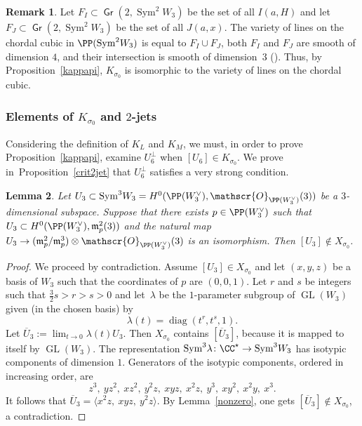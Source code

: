 \documentclass[JEP,XML,SOM,Unicode, NoEqCountersInSection,NoFloatCountersInSection]{cedram}
\let\mathcal\mathscr
\newtheorem{lemm}{Lemma}[section]
\theoremstyle{definition}
\newtheorem{rema}[lemm]{Remark}
\newcommand\cO{\mathcal{O}}\let\OO\cO
\DeclareMathOperator{\Gr}{\mathsf{Gr}}
\newcommand{\gm}{\mathfrak{m}}
\let\la\langle
\let\ra\rangle
\let\ov\overline
\DeclareMathOperator{\GL}{GL}
\DeclareMathOperator{\Sym}{Sym}
\DeclareMathOperator{\diag}{diag}
\begin{document}
\begin{rema}\label{rema710}
Let $F_I\subset \Gr(2,\Sym^2\! W_3)$ be the set of all $I(a,H)$ and let $F_J\subset \Gr(2,\Sym^2\! W_3)$ be
the set of all $J(a,x)$. The variety of lines on the chordal cubic in $\PP(\Sym^2\! W_{3})$ is equal to $F_I\cup F_J$, both $F_I$ and $F_J$ are smooth of dimension $4$, and their intersection is smooth of dimension~$3$
(\cite[Prop.\,3.2.4]{vdd}). Thus, by Proposition~\ref{kappapi}, $K_{\sigma_0}$ is isomorphic to
the variety of lines on the chordal cubic.
\end{rema}

\subsubsection{Elements of $K_{\sigma_0}$ and $2$-jets}
Considering the definition of $K_L$ and $K_M$, we must, in order to prove Proposition~\ref{kappapi}, examine $U_6^{\bot}$ when $[U_6]\in K_{\sigma_0}$. We prove in~Proposition~\ref{crit2jet} that $U_6^{\bot}$ satisfies a very strong condition.

\begin{lemm}\label{stab2jet}
Let $U_3\subset \Sym^3 \!W_3=H^0(\PP(W_3^{\vee}),\cO_{\PP(W_3^{\vee})}(3))$ be a $3$-dimensional subspace. Suppose that there exists $p\in\PP(W_3^{\vee})$ such that
$U_3\subset H^0(\PP(W_3^{\vee}),\gm_p^2(3))$ and the natural map
$U_3\to (\gm_p^2/ \gm_p^3)\otimes \cO_{\PP(W_3^{\vee})}(3)$ is an isomorphism.
Then $[U_3]\notin X_{\sigma_0}$.
\end{lemm}

\begin{proof}
We proceed by contradiction. Assume $[U_3] \in X_{\sigma_0}$ and let $(x,y,z)$ be a basis of $W_3$ such that the coordinates of $p$ are $(0,0,1)$. Let $r$ and $s$ be integers such that $ \frac{3}{2}s>r>s>0$ and let~$\lambda$ be the $1$-parameter subgroup of $\GL(W_3)$ given (in the chosen basis) by
\[\label{abps}
\lambda(t)=\diag(t^{r},t^{s},1).
\]
Let $\ov{U}_3 :=\lim_{t\to 0}\lambda(t)U_3$. Then $X_{\sigma_0}$ contains $[\ov{U}_3]$, because it is mapped to itself by $\GL(W_3)$. The representation $\Sym^3\! \lambda\colon\CC^\star\to \Sym^3\! W_3$ has isotypic components of dimension $1$. Generators of the isotypic components, ordered in increasing order, are
\[
z^3,\ yz^2,\ xz^2,\ y^2z,\ xyz,\ x^2z,\ y^3,\ xy^2,\ x^2y,\ x^3.
\]
It follows that $\ov{U}_3 =\la x^2z,\ xyz,\ y^2z\ra$. By Lemma~\ref{nonzero}, one gets $[\ov{U}_3]\notin X_{\sigma_0}$, a contradiction.
\end{proof}
\end{document}
